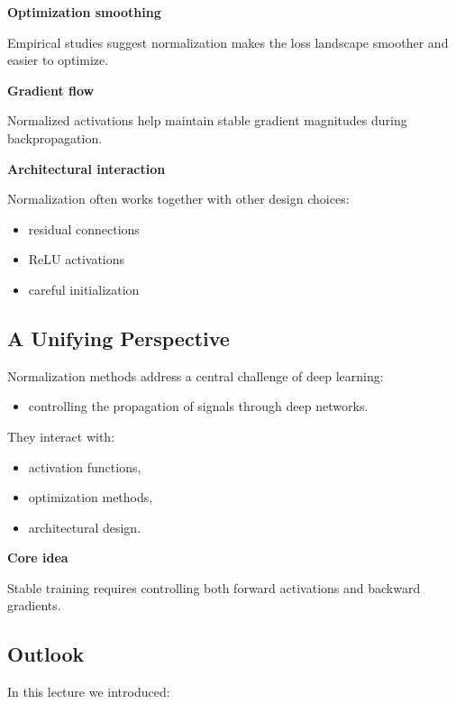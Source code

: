 \medskip

\textbf{Optimization smoothing}

Empirical studies suggest normalization makes the loss landscape smoother and easier to optimize.

\medskip

\textbf{Gradient flow}

Normalized activations help maintain stable gradient magnitudes during backpropagation.

\medskip

\textbf{Architectural interaction}

Normalization often works together with other design choices:

\begin{itemize}
\item residual connections
\item ReLU activations
\item careful initialization
\end{itemize}

\subsection{A Unifying Perspective}

Normalization methods address a central challenge of deep learning:

\begin{itemize}
\item controlling the propagation of signals through deep networks.
\end{itemize}

They interact with:

\begin{itemize}
\item activation functions,
\item optimization methods,
\item architectural design.
\end{itemize}

\medskip

\textbf{Core idea}

Stable training requires controlling both forward activations and backward gradients.

\subsection{Outlook}

In this lecture we introduced:


